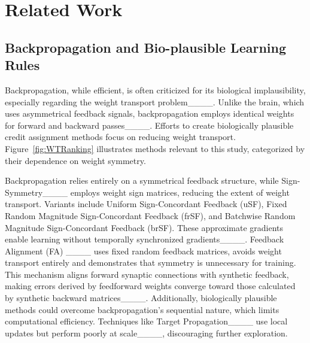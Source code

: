 \section{Related Work}
\subsection{Backpropagation and Bio-plausible Learning Rules}
Backpropagation, while efficient, is often criticized for its biological implausibility, especially regarding the weight transport problem____. Unlike the brain, which uses asymmetrical feedback signals, backpropagation employs identical weights for forward and backward passes____. Efforts to create biologically plausible credit assignment methods focus on reducing weight transport. Figure~\ref{fig:WTRanking} illustrates methods relevant to this study, categorized by their dependence on weight symmetry.

Backpropagation relies entirely on a symmetrical feedback structure, while Sign-Symmetry____ employs weight sign matrices, reducing the extent of weight transport. Variants include Uniform Sign-Concordant Feedback (uSF), Fixed Random Magnitude Sign-Concordant Feedback (frSF), and Batchwise Random Magnitude Sign-Concordant Feedback (brSF). These approximate gradients enable learning without temporally synchronized gradients____. Feedback Alignment (FA) ____ uses fixed random feedback matrices, avoids weight transport entirely and demonstrates that symmetry is unnecessary for training. This mechanism aligns forward synaptic connections with synthetic feedback, making errors derived by feedforward weights converge toward those calculated by synthetic backward matrices____. Additionally, biologically plausible methods could overcome backpropagation's sequential nature, which limits computational efficiency. Techniques like Target Propagation____ use local updates but perform poorly at scale____, discouraging further exploration.

